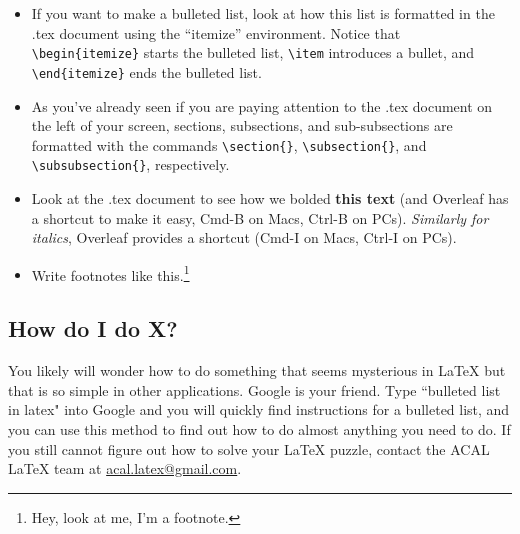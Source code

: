 \documentclass[output=paper,colorlinks,citecolor=brown,
]{langscibook}
\begin{document}
\begin{itemize}

\item If you want to make a bulleted list, look at how this list is formatted in the .tex document using the ``itemize'' environment. Notice that \verb|\begin{itemize}| starts the bulleted list, \verb|\item| introduces a bullet, and \verb|\end{itemize}| ends the bulleted list.

\item As you've already seen if you are paying attention to the .tex document on the left of your screen, sections, subsections, and sub-subsections are formatted with the commands \verb|\section{}|, \verb|\subsection{}|, and \verb|\subsubsection{}|, respectively.

\item Look at the .tex document to see how we bolded \textbf{this text} (and Overleaf has a shortcut to make it easy, Cmd-B on Macs, Ctrl-B on PCs). \textit{Similarly for italics}, Overleaf provides a shortcut (Cmd-I on Macs, Ctrl-I on PCs).

\item Write footnotes like this.\footnote{Hey, look at me, I'm a footnote.}

\end{itemize}

\subsection{How do I do X?}

You likely will wonder how to do something that seems mysterious in \LaTeX{} but that is so simple in other applications. Google is your friend. Type ``bulleted list in latex" into Google and you will quickly find instructions for a bulleted list, and you can use this method to find out how to do almost anything you need to do. If you still cannot figure out how to solve your \LaTeX{} puzzle, contact the ACAL \LaTeX{} team at \href{mailto:acal.latex@gmail.com}{acal.latex@gmail.com}. 
\end{document}
